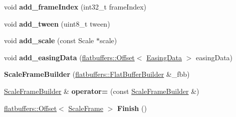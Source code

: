\begin{DoxyCompactItemize}
\item 
\mbox{\label{structflatbuffers_1_1ScaleFrameBuilder_a6e1f6ef496a8056929e229139ac0a701}} 
void {\bfseries add\+\_\+frame\+Index} (int32\+\_\+t frame\+Index)
\item 
\mbox{\label{structflatbuffers_1_1ScaleFrameBuilder_a684bc3fa9f6a0b917794cabecedb3028}} 
void {\bfseries add\+\_\+tween} (uint8\+\_\+t tween)
\item 
\mbox{\label{structflatbuffers_1_1ScaleFrameBuilder_acf4b6a253a2a4e965d95cc016ddd934c}} 
void {\bfseries add\+\_\+scale} (const Scale $\ast$scale)
\item 
\mbox{\label{structflatbuffers_1_1ScaleFrameBuilder_a519f259376edba51d938788238f8ffaf}} 
void {\bfseries add\+\_\+easing\+Data} (\hyperlink{structflatbuffers_1_1Offset}{flatbuffers\+::\+Offset}$<$ \hyperlink{structflatbuffers_1_1EasingData}{Easing\+Data} $>$ easing\+Data)
\item 
\mbox{\label{structflatbuffers_1_1ScaleFrameBuilder_a1a935dc9e1accabfa6443d5815330c10}} 
{\bfseries Scale\+Frame\+Builder} (\hyperlink{classflatbuffers_1_1FlatBufferBuilder}{flatbuffers\+::\+Flat\+Buffer\+Builder} \&\+\_\+fbb)
\item 
\mbox{\label{structflatbuffers_1_1ScaleFrameBuilder_a416785d5c3da1a0337444a26074cf95f}} 
\hyperlink{structflatbuffers_1_1ScaleFrameBuilder}{Scale\+Frame\+Builder} \& {\bfseries operator=} (const \hyperlink{structflatbuffers_1_1ScaleFrameBuilder}{Scale\+Frame\+Builder} \&)
\item 
\mbox{\label{structflatbuffers_1_1ScaleFrameBuilder_a9b234773a5bbde837b9a4db60e75f4a8}} 
\hyperlink{structflatbuffers_1_1Offset}{flatbuffers\+::\+Offset}$<$ \hyperlink{structflatbuffers_1_1ScaleFrame}{Scale\+Frame} $>$ {\bfseries Finish} ()
\end{DoxyCompactItemize}
